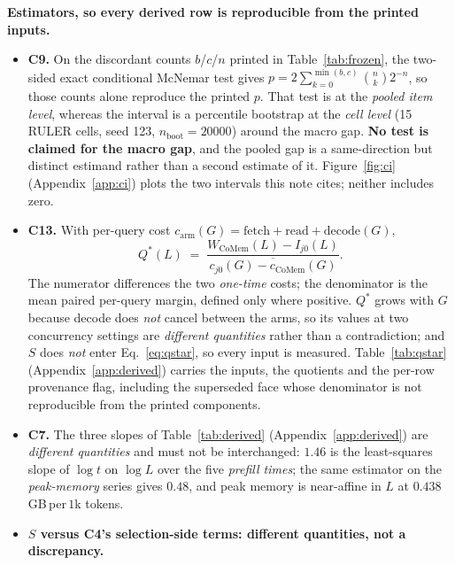 \documentclass{article}
\begin{document}
\textbf{Estimators, so every derived row is reproducible from the printed inputs.}
\begin{itemize}\itemsep0pt\parskip0pt
  \item \textbf{C9.} On the discordant counts $b$/$c$/$n$ printed in Table~\ref{tab:frozen}, the
        two-sided exact conditional McNemar test gives
        $p = 2\sum_{k=0}^{\min(b,c)}\binom{n}{k}2^{-n}$, so those counts alone reproduce the
        printed $p$. That test is at the \emph{pooled item level}, whereas the interval is a
        percentile bootstrap at the \emph{cell level} (15 RULER cells, seed 123,
        $n_{\mathrm{boot}}{=}20000$) around the macro gap. \textbf{No test is claimed for the
        macro gap}, and the pooled gap is a same-direction but distinct estimand rather than a
        second estimate of it. Figure~\ref{fig:ci} (Appendix~\ref{app:ci}) plots the two
        intervals this note cites; neither includes zero.
  \item \textbf{C13.} With per-query cost
        $c_{\mathrm{arm}}(G)=\mathrm{fetch}+\mathrm{read}+\mathrm{decode}(G)$,
        \begin{equation}\label{eq:qstar}
          Q^{*}(L)\;=\;\frac{W_{\mathrm{CoMem}}(L)-I_{j0}(L)}
                            {\overline{c_{j0}(G)-c_{\mathrm{CoMem}}(G)}}.
        \end{equation}
        The numerator differences the two \emph{one-time} costs; the denominator is the mean
        paired per-query margin, defined only where positive. $Q^{*}$ grows with $G$ because
        decode does \emph{not} cancel between the arms, so its values at two concurrency
        settings are \emph{different quantities} rather than a contradiction; and $S$ does
        \emph{not} enter Eq.~\ref{eq:qstar}, so every input is measured.
        \mbox{Table~\ref{tab:qstar}} (Appendix~\ref{app:derived}) carries the inputs, the
        quotients and the per-row provenance flag, including the superseded face whose
        denominator is not reproducible from the printed components.
  \item \textbf{C7.} The three slopes of Table~\ref{tab:derived}
        (Appendix~\ref{app:derived}) are \emph{different
        quantities} and must not be interchanged: $1.46$ is the least-squares slope of
        $\log t$ on $\log L$ over the five \emph{prefill times}; the same estimator on the
        \emph{peak-memory} series gives $0.48$, and peak memory is near-affine in $L$ at
        $0.438$\,GB\,per\,$1$k tokens.
  \item \textbf{$S$ versus C4's selection-side terms: different quantities, not a discrepancy.}

\end{itemize}
\end{document}
